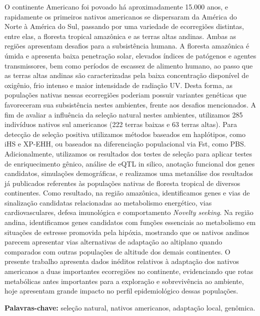 \documentclass[12pt,openright,twoside,a4paper,sumario=tradicional,english,brazil]{abntex2}
\begin{document}
O continente Americano foi povoado há aproximadamente 15.000 anos, e rapidamente os primeiros nativos americanos se dispersaram da América do Norte à América do Sul, passando por uma variedade de ecorregiões distintas, entre elas, a floresta tropical amazônica e as terras altas andinas. Ambas as regiões apresentam desafios para a subsistência humana. A floresta amazônica é úmida e apresenta baixa penetração solar, elevados índices de patógenos e agentes transmissores, bem como períodos de escassez de alimento humano, ao passo que as terras altas andinas são caracterizadas pela baixa concentração disponível de oxigênio, frio intenso e maior intensidade de radiação UV. Desta forma, as populações nativas nessas ecorregiões poderiam possuir variantes genéticas que favoreceram sua subsistência nestes ambientes, frente aos desafios mencionados. A fim de avaliar a influência da seleção natural nestes ambientes, utilizamos 285 indivíduos nativos sul americanos (222 terras baixas e 63 terras altas). Para detecção de seleção positiva utilizamos métodos baseados em haplótipos, como iHS e XP-EHH, ou baseados na diferenciação populacional via Fst, como PBS. Adicionalmente, utilizamos os resultados dos testes de seleção para aplicar testes de enriquecimento gênico, análise de eQTL in silico, anotação funcional dos genes candidatos, simulações demográficas, e realizamos uma metanálise dos resultados já publicados referentes às populações nativas de floresta tropical de diversos continentes. Como resultado, na região amazônica, identificamos genes e vias de sinalização candidatas relacionadas ao metabolismo energético, vias cardiovasculares, defesa imunológica e comportamento \textit{Novelty seeking}. Na região andina, identificamos genes candidatos com funções essenciais ao metabolismo em situações de estresse promovida pela hipóxia, mostrando que os nativos andinos parecem apresentar vias alternativas de adaptação ao altiplano quando comparados com outras populações de altitude dos demais continentes. O presente trabalho apresenta dados inéditos relativos à adaptação dos nativos americanos a duas importantes ecorregiões no continente, evidenciando que rotas metabólicas antes importantes para a exploração e sobrevivência ao ambiente, hoje apresentam grande impacto no perfil epidemiológico dessas populações.

\vspace{\onelineskip}
\vspace{\onelineskip}

\noindent \textbf{Palavras-chave:} seleção natural, nativos americanos, adaptação local, genômica.
\end{document}
